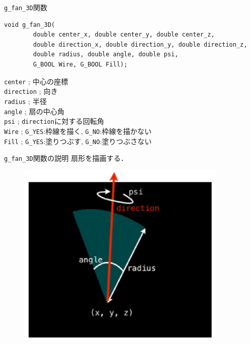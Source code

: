 \documentclass[platex,a4paper,12pt]{jsarticle}%
\begin{document}
\begin{itembox}[l]{\texttt{g\_fan\_3D}関数}
\begin{verbatim}
void g_fan_3D(
        double center_x, double center_y, double center_z,
        double direction_x, double direction_y, double direction_z,
        double radius, double angle, double psi,
        G_BOOL Wire, G_BOOL Fill);
\end{verbatim}
\verb|center| ; 中心の座標\\
\verb|direction| ; 向き\\
\verb|radius| ; 半径\\
\verb|angle| ; 扇の中心角\\
\verb|psi| ; \verb|direction|に対する回転角\\
\verb|Wire| ; \verb|G_YES|:枠線を描く, \verb|G_NO|:枠線を描かない \\
\verb|Fill| ; \verb|G_YES|:塗りつぶす, \verb|G_NO|:塗りつぶさない 
\end{itembox}

\begin{itembox}[l]{\texttt{g\_fan\_3D}関数の説明}
扇形を描画する．
\end{itembox}
\begin{figure}[htb]
\centering
	\includegraphics[width=100mm]{./Figures/eps/Canvas_g_fan.eps}
\end{figure}

\end{document}
